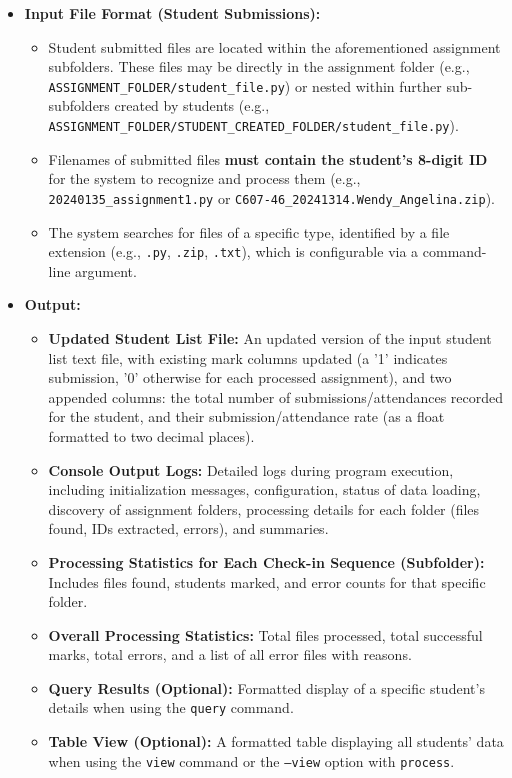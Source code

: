 \documentclass[11pt, a4paper]{article}
\begin{document}
\begin{itemize}[leftmargin=*]
    \item \textbf{Input File Format (Student Submissions):}
    \begin{itemize}
        \item Student submitted files are located within the aforementioned assignment subfolders. These files may be directly in the assignment folder (e.g.,\\ \texttt{ASSIGNMENT\_FOLDER/student\_file.py}) or nested within further sub-subfolders created by students (e.g., \texttt{ASSIGNMENT\_FOLDER/STUDENT\_CREATED\_FOLDER/student\_file.py}).
        \item Filenames of submitted files \textbf{must contain the student's 8-digit ID} for the system to recognize and process them (e.g.,\\ \texttt{20240135\_assignment1.py} or \texttt{C607-46\_20241314.Wendy\_Angelina.zip}).
        \item The system searches for files of a specific type, identified by a file extension (e.g., \texttt{.py}, \texttt{.zip}, \texttt{.txt}), which is configurable via a command-line argument.
    \end{itemize}

    \item \textbf{Output:}
    \begin{itemize}
        \item \textbf{Updated Student List File:} An updated version of the input student list text file, with existing mark columns updated (a '1' indicates submission, '0' otherwise for each processed assignment), and two appended columns: the total number of submissions/attendances recorded for the student, and their submission/attendance rate (as a float formatted to two decimal places).
        \item \textbf{Console Output Logs:} Detailed logs during program execution, including initialization messages, configuration, status of data loading, discovery of assignment folders, processing details for each folder (files found, IDs extracted, errors), and summaries.
        \item \textbf{Processing Statistics for Each Check-in Sequence (Subfolder):} Includes files found, students marked, and error counts for that specific folder.
        \item \textbf{Overall Processing Statistics:} Total files processed, total successful marks, total errors, and a list of all error files with reasons.
        \item \textbf{Query Results (Optional):} Formatted display of a specific student's details when using the \texttt{query} command.
        \item \textbf{Table View (Optional):} A formatted table displaying all students' data when using the \texttt{view} command or the \texttt{--view} option with \texttt{process}.
    \end{itemize}


\end{itemize}
\end{document}

